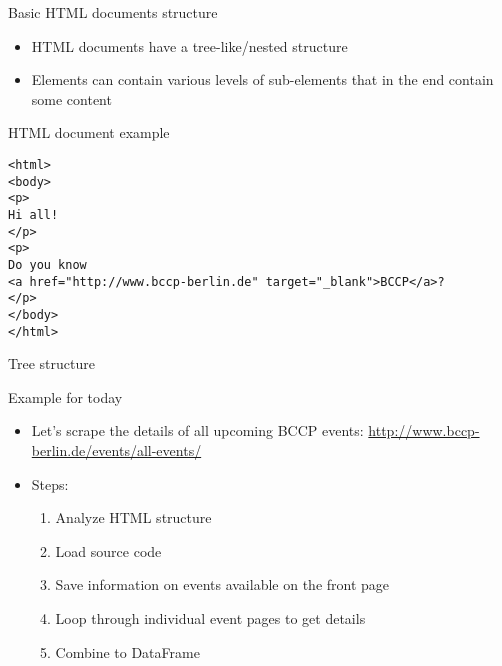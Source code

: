 \begin{frame}{Basic HTML documents structure}
\begin{itemize}
	\item HTML documents have a tree-like/nested structure
	\item Elements can contain various levels of sub-elements that in the end contain some content
\end{itemize}
\end{frame}

\begin{frame}[fragile]{HTML document example}
\begin{verbatim}
<html>
<body>
<p>
Hi all!
</p>
<p>
Do you know 
<a href="http://www.bccp-berlin.de" target="_blank">BCCP</a>?
</p>
</body>
</html>
\end{verbatim}
\end{frame}

\begin{frame}[fragile]{Tree structure}
\begin{center}
\end{center}
\end{frame}

\begin{frame}{Example for today}
\begin{itemize}
	\item Let's scrape the details of all upcoming BCCP events: \url{http://www.bccp-berlin.de/events/all-events/}
	\item Steps:
		\begin{enumerate}
			\item Analyze HTML structure
			\item Load source code
			\item Save information on events available on the front page
			\item Loop through individual event pages to get details
			\item Combine to DataFrame
		\end{enumerate}
\end{itemize}
\end{frame}

